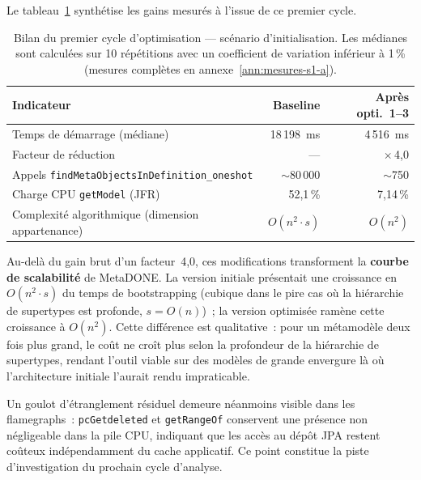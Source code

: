 Le tableau~\ref{tab:bilan-opti1} synthétise les gains mesurés à l'issue
de ce premier cycle.

\begin{table}[h]
\centering
\caption{Bilan du premier cycle d'optimisation --- scénario
d'initialisation. Les médianes sont calculées sur 10 répétitions avec un
coefficient de variation inférieur à 1\,\% (mesures complètes en
annexe~\ref{ann:mesures-s1-a}).}
\label{tab:bilan-opti1}
\begin{tabular}{lrr}
\hline
\textbf{Indicateur} & \textbf{Baseline} & \textbf{Après opti.~1--3} \\
\hline
Temps de démarrage (médiane) & 18\,198~ms & 4\,516~ms \\
Facteur de réduction & --- & $\times$\,4,0 \\
Appels \texttt{findMetaObjectsInDefinition\_oneshot} & $\sim$80\,000 &
$\sim$750 \\
Charge CPU \texttt{getModel} (JFR) & 52,1\,\% & 7,14\,\% \\
Complexité algorithmique (dimension appartenance) & $O(n^2 \cdot s)$ & $O(n^2)$
\\
\hline
\end{tabular}
\end{table}

Au-delà du gain brut d'un facteur~4,0, ces modifications transforment
la \textbf{courbe de scalabilité} de MetaDONE. La version initiale
présentait une croissance en $O(n^2 \cdot s)$ du temps de bootstrapping
(cubique dans le pire cas où la hiérarchie de supertypes est profonde,
$s = O(n)$)~; la version optimisée ramène cette croissance à $O(n^2)$.
Cette différence est qualitative~: pour un métamodèle deux fois plus
grand, le coût ne croît plus selon la profondeur de la hiérarchie de
supertypes, rendant l'outil viable sur des modèles de grande envergure
là où l'architecture initiale l'aurait rendu impraticable.

Un goulot d'étranglement résiduel demeure néanmoins visible dans les
flamegraphs~: \texttt{pcGetdeleted} et \texttt{getRangeOf} conservent
une présence non négligeable dans la pile CPU, indiquant que les accès
au dépôt JPA restent coûteux indépendamment du cache applicatif. Ce
point constitue la piste d'investigation du prochain cycle d'analyse.